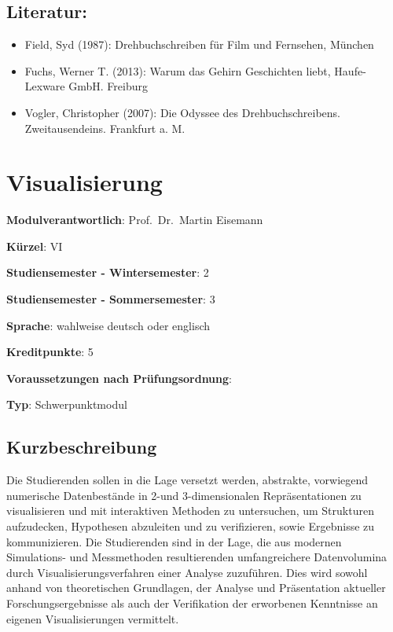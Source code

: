 \section*{Literatur:}\label{literatur-17}

\begin{itemize}
\tightlist
\item
  Field, Syd (1987): Drehbuchschreiben für Film und Fernsehen, München
\item
  Fuchs, Werner T. (2013): Warum das Gehirn Geschichten liebt,
  Haufe-Lexware GmbH. Freiburg
\item
  Vogler, Christopher (2007): Die Odyssee des Drehbuchschreibens.
  Zweitausendeins. Frankfurt a. M.
\end{itemize}

\chapter{Visualisierung}\label{visualisierung}

\begin{modulHead}
\textbf{Modulverantwortlich}: Prof.~Dr.~Martin
Eisemann
\end{modulHead}
\begin{modulHead}
\textbf{Kürzel}:
VI
\end{modulHead}
\begin{modulHead}
\textbf{Studiensemester -
Wintersemester}:
2
\end{modulHead}
\begin{modulHead}
\textbf{Studiensemester -
Sommersemester}: 3
\end{modulHead}
\begin{modulHead}
\textbf{Sprache}:
wahlweise deutsch oder
englisch
\end{modulHead}
\begin{modulHead}
\textbf{Kreditpunkte}:
5
\end{modulHead}
\begin{modulHead}
\textbf{Voraussetzungen nach
Prüfungsordnung}: ~
\end{modulHead}
\begin{modulHead}
\textbf{Typ}:
Schwerpunktmodul
\end{modulHead}


\section*{Kurzbeschreibung}\label{kurzbeschreibung-14}

Die Studierenden sollen in die Lage versetzt werden, abstrakte,
vorwiegend numerische Datenbestände in 2-und 3-dimensionalen
Repräsentationen zu visualisieren und mit interaktiven Methoden zu
untersuchen, um Strukturen aufzudecken, Hypothesen abzuleiten und zu
verifizieren, sowie Ergebnisse zu kommunizieren. Die Studierenden sind
in der Lage, die aus modernen Simulations- und Messmethoden
resultierenden umfangreichere Datenvolumina durch
Visualisierungsverfahren einer Analyse zuzuführen. Dies wird sowohl
anhand von theoretischen Grundlagen, der Analyse und Präsentation
aktueller Forschungsergebnisse als auch der Verifikation der erworbenen
Kenntnisse an eigenen Visualisierungen vermittelt.

